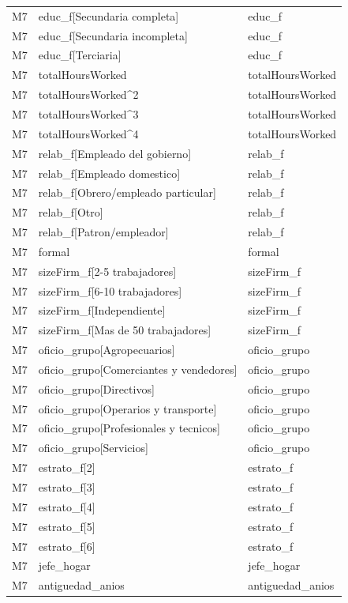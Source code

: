 \begin{longtable}{lll}
M7 & educ\_f[Secundaria completa] & educ\_f \\
M7 & educ\_f[Secundaria incompleta] & educ\_f \\
M7 & educ\_f[Terciaria] & educ\_f \\
M7 & totalHoursWorked & totalHoursWorked \\
M7 & totalHoursWorked\textasciicircum 2 & totalHoursWorked \\
M7 & totalHoursWorked\textasciicircum 3 & totalHoursWorked \\
M7 & totalHoursWorked\textasciicircum 4 & totalHoursWorked \\
M7 & relab\_f[Empleado del gobierno] & relab\_f \\
M7 & relab\_f[Empleado domestico] & relab\_f \\
M7 & relab\_f[Obrero/empleado particular] & relab\_f \\
M7 & relab\_f[Otro] & relab\_f \\
M7 & relab\_f[Patron/empleador] & relab\_f \\
M7 & formal & formal \\
M7 & sizeFirm\_f[2-5 trabajadores] & sizeFirm\_f \\
M7 & sizeFirm\_f[6-10 trabajadores] & sizeFirm\_f \\
M7 & sizeFirm\_f[Independiente] & sizeFirm\_f \\
M7 & sizeFirm\_f[Mas de 50 trabajadores] & sizeFirm\_f \\
M7 & oficio\_grupo[Agropecuarios] & oficio\_grupo \\
M7 & oficio\_grupo[Comerciantes y vendedores] & oficio\_grupo \\
M7 & oficio\_grupo[Directivos] & oficio\_grupo \\
M7 & oficio\_grupo[Operarios y transporte] & oficio\_grupo \\
M7 & oficio\_grupo[Profesionales y tecnicos] & oficio\_grupo \\
M7 & oficio\_grupo[Servicios] & oficio\_grupo \\
M7 & estrato\_f[2] & estrato\_f \\
M7 & estrato\_f[3] & estrato\_f \\
M7 & estrato\_f[4] & estrato\_f \\
M7 & estrato\_f[5] & estrato\_f \\
M7 & estrato\_f[6] & estrato\_f \\
M7 & jefe\_hogar & jefe\_hogar \\
M7 & antiguedad\_anios & antiguedad\_anios \\

\end{longtable}
